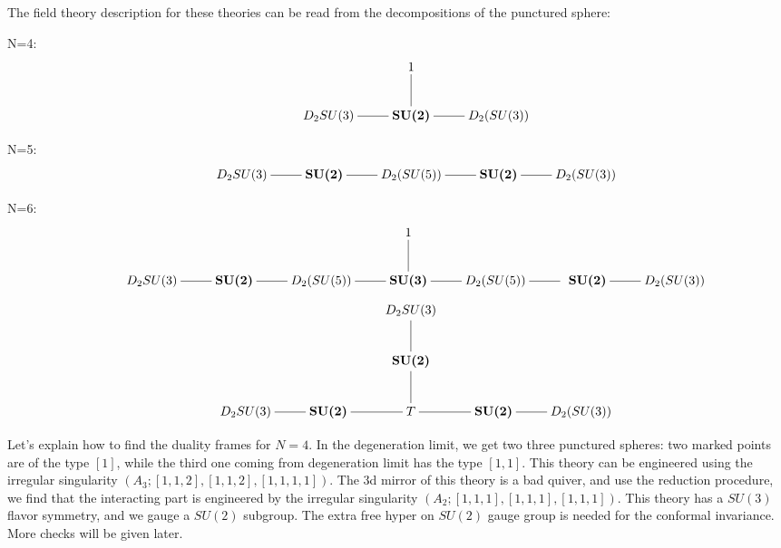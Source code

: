 \documentclass[a4paper,11pt]{article}
\begin{document}
\newpage

The field theory description for these theories can be read from the decompositions of the punctured sphere: 

N=4:~~
\begin{equation}
\xymatrix{
	&  &  1\ar@{-}[d]
	\\
	&  D_2SU(3) \ar@{-}[r]&  \textbf{SU(2)} \ar@{-}[r]&D_2(SU(3)) 
}
\end{equation}

N=5:~~
\begin{equation}
\xymatrix{
	&  D_2SU(3) \ar@{-}[r]&  \textbf{SU(2)} \ar@{-}[r]&D_2(SU(5))  \ar@{-}[r]&  \textbf{SU(2)} \ar@{-}[r]&D_2(SU(3)) 
}
\end{equation}

N=6:
\begin{equation}
\xymatrix{
	&  &  &&1\ar@{-}[d]
	\\
	&  D_2SU(3) \ar@{-}[r]&  \textbf{SU(2)} \ar@{-}[r]&D_2(SU(5)) \ar@{-}[r] & \textbf{SU(3)} \ar@{-}[r] &D_2(SU(5))   \ar@{-}[r]& \textbf{ SU(2)} \ar@{-}[r]&D_2(SU(3)) 
}
\end{equation}
\begin{equation}
\xymatrix{
	&  &  &D_2SU(3)\ar@{-}[d]
\\
	&  &  &\textbf{SU(2)}\ar@{-}[d]
	\\
	&  D_2SU(3) \ar@{-}[r]&  \textbf{SU(2)} \ar@{-}[r]&T \ar@{-}[r] &   \textbf{SU(2)} \ar@{-}[r]&D_2(SU(3)) 
}
\end{equation}

Let's explain how to find the duality frames for $N=4$.  In the degeneration limit, we get two three punctured spheres: two marked points are of the type $[1]$, 
while the third one coming from degeneration limit has the type $[1,1]$. This theory can be engineered using the irregular singularity $(A_3; [1,1,2],[1,1,2],[1,1,1,1])$. The 3d mirror of this 
theory is a bad quiver, and use the reduction procedure, we find that the interacting part is engineered by the irregular singularity $(A_2; [1,1,1],[1,1,1],[1,1,1])$.
This theory has a $SU(3)$ flavor symmetry, and we gauge a $SU(2)$ subgroup.
The extra free hyper on $SU(2)$ gauge group  is needed for the conformal invariance. More checks will be given later. 
\end{document}

